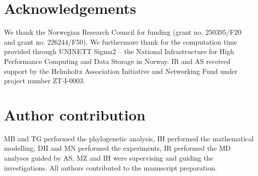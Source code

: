 
\section*{Acknowledgements}

We thank the Norwegian Research Council for funding (grant no. 250395/F20 and grant no. 226244/F50). We furthermore thank for the computation time provided through UNINETT Sigma2 – the National Infrastructure for High Performance Computing and Data Storage in Norway. IR and AS received support by the Helmholtz Association Initiative and Networking Fund under project number ZT-I-0003.

\section*{Author contribution}
MB and TG performed the phylogenetic analysis, IH performed the mathematical modelling, DH and MN performed the experiments, IR performed the MD analyses guided by AS, MZ and IH were supervising and guiding the investigations.
All authors contributed to the manuscript preparation. 